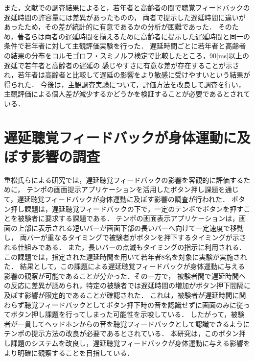 また，文献\cite{shigematu-toukyoushibu}での調査結果によると，若年者と高齢者の間で聴覚フィードバックの遅延時間の許容量には差異があったものの，
両者で提示した遅延時間に違いがあったため，その差が統計的に有意であるかの分析が困難であった．
そのため，著者らは両者の遅延時間を揃えるために高齢者に提示した遅延時間と同一の条件で若年者に対して主観評価実験を行った．
遅延時間ごとに若年者と高齢者の結果の分布をコルモゴロフ・スミノルフ検定で比較したところ，90[ms]以上の遅延で若年者と高齢者の遅延の
感じやすさに有意な差が存在することが示され，若年者は高齢者と比較して遅延の影響をより敏感に受けやすいという結果が得られた．
今後は，主観調査実験について，評価方法を改良して調査を行い，主観評価による個人差が減少するかどうかを検証することが必要であるとされている．
\section{遅延聴覚フィードバックが身体運動に及ぼす影響の調査}
重松氏らによる研究\cite{shigematu}では，遅延聴覚フィードバックの影響を客観的に評価するために，
テンポの画面提示アプリケーション\cite{Syuuronn-shigematu}を活用したボタン押し課題を通じて，遅延聴覚フィードバックが身体運動に及ぼす影響の調査が行われた．
ボタン押し課題は，遅延聴覚フィードバックの下で，一定のテンポでボタンを押すことを被験者に要求する課題である．
テンポの画面表示アプリケーションは，画面の上部に表示される短いバーが画面下部の長いバーへ向けて一定速度で移動し，
両バーが重なるタイミングで被験者がボタンを押下するタイミングが示される仕組みである．
また，長いバーの点滅もタイミングの指示に利用される．
この課題では，指定された遅延時間を用いて若年者8名を対象に実験が実施された．
結果として，この課題による遅延聴覚フィードバックが身体運動に与える影響の観察が可能であることが分かった．その一方で，
被験者間で遅延時間への反応に差異が認められ，特定の被験者では遅延時間の増加がボタン押下間隔に及ぼす影響が限定的であることが確認された．
これは，被験者が遅延時間に関わらず聴覚フィードバックとしてボタン押下時の音を認識せずに画面のみに従ってボタン押し課題を行ってしまった可能性を示唆している．
したがって，被験者が一貫してヘッドホンからの音を聴覚フィードバックとして認識できるようにテンポの提示方法の改良が必要であるとされている．
本研究は，このボタン押し課題のシステムを改良し，遅延聴覚フィードバックが身体運動に与える影響をより明確に観察することを目指している．
